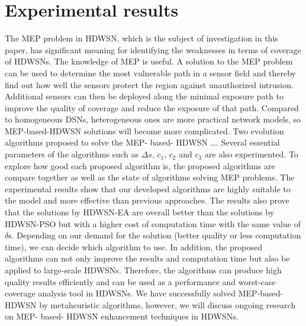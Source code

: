 \documentclass[final]{elsarticle}
\begin{document}
\section{Experimental results}
The MEP problem in HDWSN, which is the subject of investigation in this paper, has significant meaning for identifying the weaknesses in terms of coverage of HDWSNs. The knowledge of MEP is useful. A solution to the MEP problem can be used to determine the most vulnerable path in a sensor field and thereby find out how well the sensors protect the region against unauthorized intrusion. Additional sensors can then be deployed along the minimal exposure path to improve the quality of coverage and reduce the exposure of that path. Compared to homogeneous DSNs, heterogeneous ones are more practical network models, so MEP-based-HDWSN solutions will become more complicated. Two evolution algorithms proposed to solve the MEP- based- HDWSN …. Several essential parameters of the algorithms such as $\Delta s$, $ c_1 $, $ c_2 $ and $ c_3 $ are also experimented. To explore how good each proposed algorithm is, the proposed algorithms are compare together as well as the state of algorithms solving MEP problems. The experimental results show that our developed algorithms are highly suitable to the model and more effective than previous approaches. The results also prove that the solutions by HDWSN-EA are overall better than the solutions by HDWSN-PSO but with a higher cost of computation time with the same value of $\delta$s. Depending on our demand for the solution (better quality or less computation time), we can decide which algorithm to use. In addition, the proposed algorithms can not only improve the results and computation time but also be applied to large-scale HDWSNs. Therefore, the algorithms can produce high quality results efficiently and can be used as a performance and worst-case coverage analysis tool in HDWSNs. We have successfully solved MEP-based-HDWSN by metaheuristic algorithms, however, we will discuss ongoing research on MEP- based- HDWSN enhancement techniques in HDWSNs.
\end{document}
